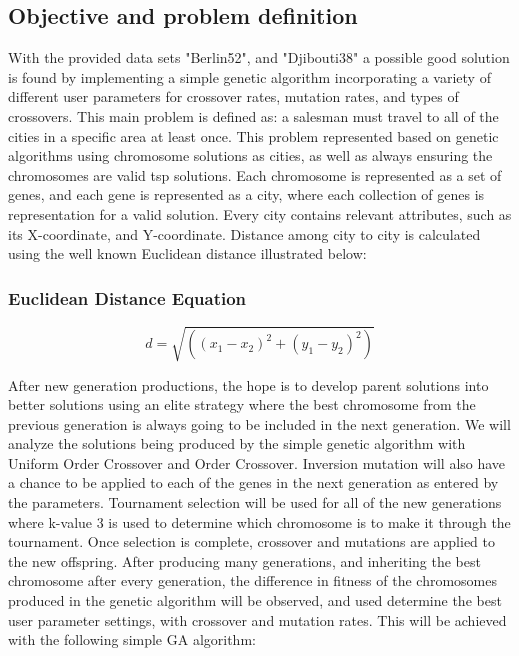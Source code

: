 \documentclass[conference]{IEEEtran}
\begin{document}
\subsection{Objective and problem definition}
With the provided data sets "Berlin52", and "Djibouti38" a possible good solution is found by implementing a simple genetic algorithm incorporating a variety of different user parameters for crossover rates, mutation rates, and types of crossovers. This main problem is defined as: a salesman must travel to all of the cities in a specific area at least once. This problem represented based on genetic algorithms using chromosome solutions as cities, as well as always ensuring the chromosomes are valid tsp solutions. Each chromosome is represented as a set of genes, and each gene is represented as a city, where each collection of genes is representation for a valid solution. Every city contains relevant attributes, such as its X-coordinate, and Y-coordinate. Distance among city to city is calculated using the well known Euclidean distance illustrated below: 


\subsubsection{Euclidean Distance Equation}
\begin{equation}
	d=\sqrt{((x_1-x_2)^2 + (y_1-y_2)^2)}
\end{equation}

After new generation productions, the hope is to develop parent solutions into better solutions using an elite strategy where the best chromosome from the previous generation is always going to be included in the next generation. We will analyze the solutions being produced by the simple genetic algorithm with Uniform Order Crossover and Order Crossover. Inversion mutation will also have a chance to be applied to each of the genes in the next generation as entered by the parameters. Tournament selection will be used for all of the new generations where k-value 3 is used to determine which chromosome is to make it through the tournament. Once selection is complete, crossover and mutations are applied to the new offspring. After producing many generations, and inheriting the best chromosome after every generation, the difference in fitness of the chromosomes produced in the genetic algorithm will be observed, and used determine the best user parameter settings, with crossover and mutation rates. This will be achieved with the following simple GA algorithm:
\end{document}
